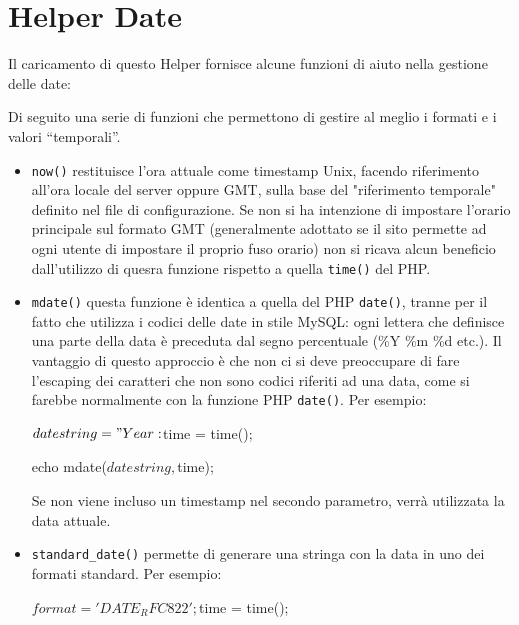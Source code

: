 \section{Helper Date}
\label{helper:date}

Il caricamento di questo Helper fornisce alcune funzioni di aiuto nella gestione delle date:


Di seguito una serie di funzioni che permettono di gestire al meglio i formati e i valori ``temporali''.

\begin{itemize}
\item \verb|now()| restituisce l'ora attuale come timestamp Unix, facendo riferimento all'ora locale del server oppure GMT, sulla base del "riferimento temporale" definito nel file di configurazione. Se non si ha intenzione di impostare l'orario principale sul formato GMT (generalmente adottato se il sito permette ad ogni utente di impostare il proprio fuso orario) non si ricava alcun beneficio dall'utilizzo di quesra funzione rispetto a quella \verb|time()| del PHP.

\item \verb|mdate()| questa funzione è identica a quella del PHP \verb|date()|, tranne per il fatto che utilizza i codici delle date in stile MySQL: ogni lettera che definisce una parte della data è preceduta dal segno percentuale (\%Y \%m \%d etc.). Il vantaggio di questo approccio è che non ci si deve preoccupare di fare l'escaping dei caratteri che non sono codici riferiti ad una data, come si farebbe normalmente con la funzione PHP \verb|date()|. Per esempio:

\begin{code}
$datestring = "Year: %
$time = time();

echo mdate($datestring, $time);
\end{code}

Se non viene incluso un timestamp nel secondo parametro, verrà utilizzata la data attuale.

\item \verb|standard_date()| permette di generare una stringa con la data in uno dei formati standard. Per esempio:

\begin{code}
$format = 'DATE_RFC822';
$time = time();


\end{code}
\end{itemize}
